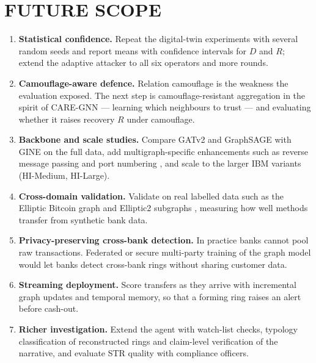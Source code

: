 \chapter{FUTURE SCOPE}

\begin{enumerate}
    \item \textbf{Statistical confidence.} Repeat the digital-twin experiments with several random seeds and report means with confidence intervals for $D$ and $R$; extend the adaptive attacker to all six operators and more rounds.
    \item \textbf{Camouflage-aware defence.} Relation camouflage is the weakness the evaluation exposed. The next step is camouflage-resistant aggregation in the spirit of CARE-GNN \cite{dou2020enhancing} --- learning which neighbours to trust --- and evaluating whether it raises recovery $R$ under camouflage.
    \item \textbf{Backbone and scale studies.} Compare GATv2 and GraphSAGE with GINE on the full data, add multigraph-specific enhancements such as reverse message passing and port numbering \cite{egressy2024provably}, and scale to the larger IBM variants (HI-Medium, HI-Large).
    \item \textbf{Cross-domain validation.} Validate on real labelled data such as the Elliptic Bitcoin graph \cite{weber2019antimoney} and Elliptic2 subgraphs \cite{bellei2024shape}, measuring how well methods transfer from synthetic bank data.
    \item \textbf{Privacy-preserving cross-bank detection.} In practice banks cannot pool raw transactions. Federated or secure multi-party training of the graph model would let banks detect cross-bank rings without sharing customer data.
    \item \textbf{Streaming deployment.} Score transfers as they arrive with incremental graph updates and temporal memory, so that a forming ring raises an alert before cash-out.
    \item \textbf{Richer investigation.} Extend the agent with watch-list checks, typology classification of reconstructed rings and claim-level verification of the narrative, and evaluate STR quality with compliance officers.
\end{enumerate}
